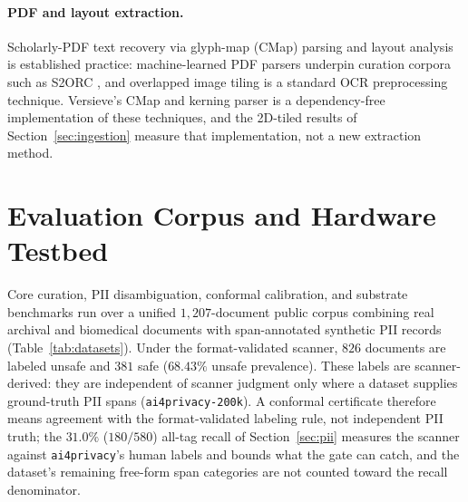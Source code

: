 \documentclass{article}
\begin{document}
\paragraph{PDF and layout extraction.}
Scholarly-PDF text recovery via glyph-map (CMap) parsing and layout analysis is established practice: machine-learned PDF parsers underpin curation corpora such as S2ORC \citep{lo2020s2orc}, and overlapped image tiling is a standard OCR preprocessing technique. Versieve's CMap and kerning parser is a dependency-free implementation of these techniques, and the 2D-tiled results of Section~\ref{sec:ingestion} measure that implementation, not a new extraction method.

\section{Evaluation Corpus and Hardware Testbed}
\label{sec:datasets}

Core curation, PII disambiguation, conformal calibration, and substrate benchmarks run over a unified $1{,}207$-document public corpus combining real archival and biomedical documents with span-annotated synthetic PII records (Table~\ref{tab:datasets}). Under the format-validated scanner, $826$ documents are labeled unsafe and $381$ safe ($68.43\%$ unsafe prevalence). These labels are scanner-derived: they are independent of scanner judgment only where a dataset supplies ground-truth PII spans (\texttt{ai4privacy-200k}). A conformal certificate therefore means agreement with the format-validated labeling rule, not independent PII truth; the $31.0\%$ ($180/580$) all-tag recall of Section~\ref{sec:pii} measures the scanner against \texttt{ai4privacy}'s human labels and bounds what the gate can catch, and the dataset's remaining free-form span categories are not counted toward the recall denominator.
\end{document}
